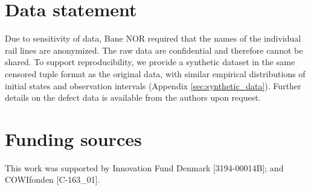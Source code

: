 \section*{Data statement}
Due to sensitivity of data, Bane NOR required that the names of the individual rail lines are anonymized. The raw data are confidential and therefore cannot be shared. To support reproducibility, we provide a synthetic dataset in the same censored tuple format as the original data, with similar empirical distributions of initial states and observation intervals (Appendix \ref{sec:synthetic_data}). Further details on the defect data is available from the authors upon request.


\section*{Funding sources}
This work was supported by Innovation Fund Denmark [3194-00014B]; and COWIfonden [C-163\_01].

